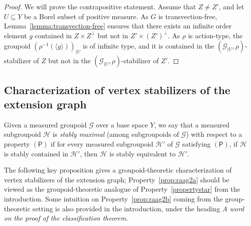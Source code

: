 \documentclass[JEP,XML,SOM,Unicode,NoFloatCountersInSection,published]{cedram}
\let\mathcal\mathscr
\theoremstyle{plain}
\theoremstyle{definition}
\newcommand{\calg}{\mathcal{G}}
\newcommand{\calh}{\mathcal{H}}
\begin{document}
\begin{proof}
We will prove the contrapositive statement. Assume that $Z\neq Z'$, and let $U\subseteq Y$ be a Borel subset of positive measure. As $G$ is transvection-free, Lemma~\ref{lemma:transvection-free} ensures that there exists an infinite order element $g$ contained in $Z\times Z^\perp$ but not in $Z'\times (Z')^{\perp}$. As $\rho$ is action-type, the groupoid $(\rho^{-1}(\langle g\rangle))_{|U}$ is of infinite type, and it is contained in the $(\calg_{|U},\rho)$-stabilizer of $Z$ but not in the $(\calg_{|U},\rho)$-stabilizer of $Z'$.
\end{proof}

\subsection{Characterization of vertex stabilizers of the extension graph}\label{sec:vertex}

Given a measured groupoid $\calg$ over a base space $Y$, we say that a measured subgroupoid $\calh$ is \emph{stably maximal} (among subgroupoids of $\calg$) with respect to a property $(\mathsf{P})$ if for every measured subgroupoid $\calh'$ of $\calg$ satisfying $(\mathsf{P})$, if $\calh$ is stably contained in $\calh'$, then $\calh$ is stably equivalent to $\calh'$.

The following key proposition gives a groupoid-theoretic characterization of vertex stabilizers of the extension graph; Property~\eqref{prop:raag2a} should be viewed as the groupoid-theoretic analogue of Property~\eqref{propertystar} from the introduction. Some intuition on Property~\eqref{prop:raag2b} coming from the group-theoretic setting is also provided in the introduction, under the heading \emph{A word on the proof of the classification theorem}.
\end{document}
